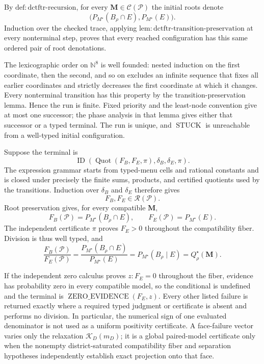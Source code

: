 By \(\mathrm{def:dctftr\text{-}recursion}\), for every \(\mathbf M\in\mathcal C(\mathcal P)\) the initial roots denote
\[
\bigl(P_{M^\star}(B_\rho\cap E),P_{M^\star}(E)\bigr).
\]
Induction over the checked trace, applying \(\mathrm{lem:dctftr\text{-}transition\text{-}preservation}\) at every nonterminal step, proves that every reached configuration has this same ordered pair of root denotations.

The lexicographic order on \(\mathbb N^8\) is well founded: nested induction on the first coordinate, then the second, and so on excludes an infinite sequence that fixes all earlier coordinates and strictly decreases the first coordinate at which it changes. Every nonterminal transition has this property by the transition-preservation lemma. Hence the run is finite. Fixed priority and the least-node convention give at most one successor; the phase analysis in that lemma gives either that successor or a typed terminal. The run is unique, and \(\operatorname{STUCK}\) is unreachable from a well-typed initial configuration.

Suppose the terminal is
\[
\operatorname{ID}(\operatorname{Quot}(F_B,F_E,\pi),\delta_B,\delta_E,\pi).
\]
The expression grammar starts from typed-menu cells and rational constants and is closed under precisely the finite sums, products, and certified quotients used by the transitions. Induction over \(\delta_B\) and \(\delta_E\) therefore gives
\[
F_B,F_E\in\mathscr R(\mathcal P).
\]
Root preservation gives, for every compatible \(\mathbf M\),
\[
F_B(\mathcal P)=P_{M^\star}(B_\rho\cap E),
\qquad
F_E(\mathcal P)=P_{M^\star}(E).
\]
The independent certificate \(\pi\) proves \(F_E>0\) throughout the compatibility fiber. Division is thus well typed, and
\[
\frac{F_B(\mathcal P)}{F_E(\mathcal P)}
=\frac{P_{M^\star}(B_\rho\cap E)}{P_{M^\star}(E)}
=P_{M^\star}(B_\rho\mid E)
=Q_\rho^\star(\mathbf M).
\]

If the independent zero calculus proves \(z:F_E=0\) throughout the fiber, evidence has probability zero in every compatible model, so the conditional is undefined and the terminal is \(\operatorname{ZERO\_EVIDENCE}(F_E,z)\). Every other listed failure is returned exactly where a required typed judgment or certificate is absent and performs no division. In particular, the numerical sign of one evaluated denominator is not used as a uniform positivity certificate. A face-failure vector varies only the relaxation \(\mathcal K_D(m_D)\); it is a global paired-model certificate only when the nonempty district-saturated compatibility fiber and separation hypotheses independently establish exact projection onto that face.